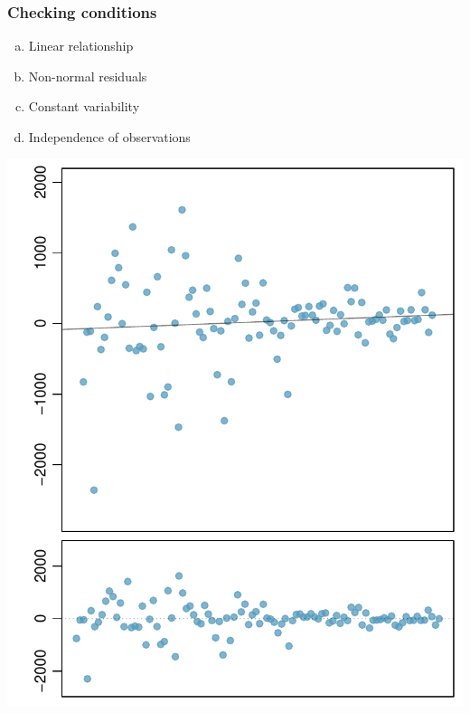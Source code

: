 \documentclass[slidestop,compress,mathserif,12pt,t,professionalfonts,xcolor=table]{beamer}
\newcommand{\solnMult}[1]{#1}
\begin{document}
\begin{frame}
\frametitle{Checking conditions}

{
\begin{enumerate}[(a)]
\item Linear relationship
\item Non-normal residuals
\item \solnMult{Constant variability}
\item Independence of observations
\end{enumerate}
}
{
\begin{center}
\includegraphics[width=\textwidth]{figures/problems/heteroscedastic}
\end{center}
}

\end{frame}

\end{document}
